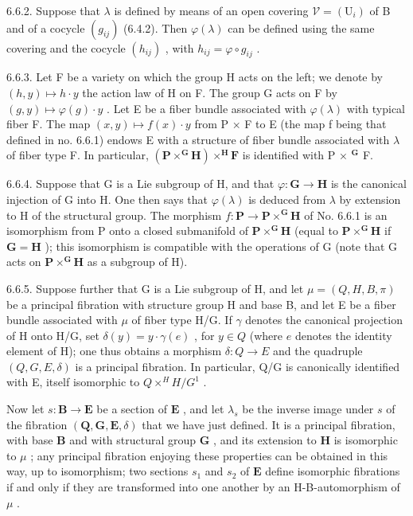 6.6.2. Suppose that \(\lambda\) is defined by means of an open covering \(\mathcal{V} = (\mathrm{U}_i)\) of B and of a cocycle \((g_{ij})\) (6.4.2). Then \(\varphi(\lambda)\) can be defined using the same covering and the cocycle \((h_{ij})\) , with \(h_{ij} = \varphi \circ g_{ij}\) .

6.6.3. Let F be a variety on which the group H acts on the left; we denote by \((h, y) \mapsto h \cdot y\) the action law of H on F. The group G acts on F by \((g, y) \mapsto \varphi(g) \cdot y\) . Let E be a fiber bundle associated with \(\varphi(\lambda)\) with typical fiber F. The map \((x, y) \mapsto f(x) \cdot y\) from P × F to E (the map f being that defined in no. 6.6.1) endows E with a structure of fiber bundle associated with \(\lambda\) of fiber type F. In particular, \((\mathbf{P} \times^{\mathbf{G}}\mathbf{H}) \times^{\mathbf{H}}\mathbf{F}\) is identified with P × \(^{\mathbf{G}}\) F.

6.6.4. Suppose that G is a Lie subgroup of H, and that \(\varphi: \mathbf{G} \to \mathbf{H}\) is the canonical injection of G into H. One then says that \(\varphi(\lambda)\) is deduced from \(\lambda\) by extension to H of the structural group. The morphism \(f: \mathbf{P} \to \mathbf{P} \times^{\mathbf{G}} \mathbf{H}\) of No. 6.6.1 is an isomorphism from P onto a closed submanifold of \(\mathbf{P} \times^{\mathbf{G}} \mathbf{H}\) (equal to \(\mathbf{P} \times^{\mathbf{G}} \mathbf{H}\) if \(\mathbf{G} = \mathbf{H}\) ); this isomorphism is compatible with the operations of G (note that G acts on \(\mathbf{P} \times^{\mathbf{G}} \mathbf{H}\) as a subgroup of H).

6.6.5. Suppose further that G is a Lie subgroup of H, and let \(\mu = (Q, H, B, \pi)\) be a principal fibration with structure group H and base B, and let E be a fiber bundle associated with \(\mu\) of fiber type H/G. If \(\gamma\) denotes the canonical projection of H onto H/G, set \(\delta(y) = y \cdot \gamma(e)\) , for \(y \in Q\) (where \(e\) denotes the identity element of H); one thus obtains a morphism \(\delta: Q \to E\) and the quadruple \((Q, G, E, \delta)\) is a principal fibration. In particular, Q/G is canonically identified with E, itself isomorphic to \(Q \times^{H} H/G^{1}\) .

Now let \(s: \mathbf{B} \to \mathbf{E}\) be a section of \(\mathbf{E}\) , and let \(\lambda_s\) be the inverse image under \(s\) of the fibration \((\mathbf{Q}, \mathbf{G}, \mathbf{E}, \delta)\) that we have just defined. It is a principal fibration, with base \(\mathbf{B}\) and with structural group \(\mathbf{G}\) , and its extension to \(\mathbf{H}\) is isomorphic to \(\mu\) ; any principal fibration enjoying these properties can be obtained in this way, up to isomorphism; two sections \(s_1\) and \(s_2\) of \(\mathbf{E}\) define isomorphic fibrations if and only if they are transformed into one another by an H-B-automorphism of \(\mu\) .

